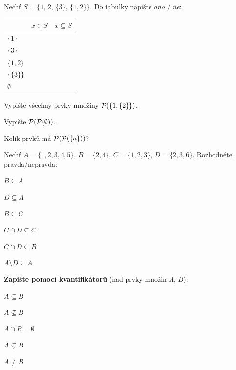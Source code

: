 \documentclass[11pt,a4paper]{article}
\begin{document}
\Needspace*{9.0cm}
Nechť $S=\{1,\,2,\,\{3\},\,\{1,2\}\}$. Do tabulky napište \emph{ano} / \emph{ne}:
\par\vspace{5pt}
\begin{center}
\renewcommand{\arraystretch}{2.15}
\setlength{\tabcolsep}{14pt}
\begin{tabular}{@{}|>{\centering\arraybackslash}p{2.6cm}|>{\centering\arraybackslash}p{2.6cm}|>{\centering\arraybackslash}p{2.6cm}|@{}}
\hline
{\sffamily\small\color{muted}$x$} & {\sffamily\small\color{muted}$x\in S$} & {\sffamily\small\color{muted}$x\subseteq S$}\\
\hline
$\{1\}$ & & \\ \hline
$\{3\}$ & & \\ \hline
$\{1,2\}$ & & \\ \hline
$\{\{3\}\}$ & & \\ \hline
$\emptyset$ & & \\ \hline
\end{tabular}
\end{center}

\Needspace*{8.4cm}
\begin{pol}
  \item Vypište všechny prvky množiny $\mathcal P(\{1,\{2\}\})$.
  \item Vypište $\mathcal P(\mathcal P(\emptyset))$.
  \item Kolik prvků má $\mathcal P(\mathcal P(\{a\}))$?
\end{pol}
\misto{5cm}


\Needspace*{6.7cm}
Nechť $A=\{1,2,3,4,5\}$, $B=\{2,4\}$, $C=\{1,2,3\}$, $D=\{2,3,6\}$. Rozhodněte pravda/nepravda:
\begin{dvasl}
  \item $B\subseteq A$
  \item $D\subseteq A$
  \item $B\subseteq C$
  \item $C\cap D\subseteq C$
  \item $C\cap D\subseteq B$
  \item $A\setminus D\subseteq A$
\end{dvasl}
\misto{3.3cm}

\Needspace*{8.4cm}
\textbf{Zapište pomocí kvantifikátorů} (nad prvky množin $A$, $B$):
\begin{dvasl}
  \item $A\subseteq B$
  \item $A\nsubseteq B$
  \item $A\cap B=\emptyset$
  \item $A\subsetneq B$
  \item $A\neq B$
\end{dvasl}
\misto{5cm}
\end{document}

